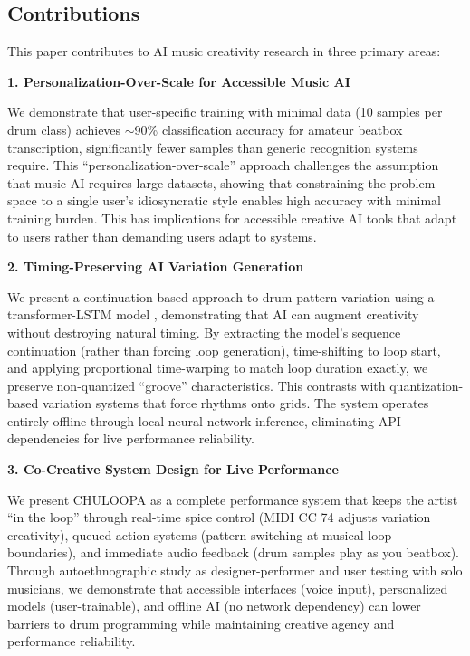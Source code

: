\documentclass{aimc2026}
\begin{document}
\subsection{Contributions}

This paper contributes to AI music creativity research in three primary areas:

\textbf{1. Personalization-Over-Scale for Accessible Music AI}

We demonstrate that user-specific training with minimal data (10 samples per drum class) achieves $\sim$90\% classification accuracy for amateur beatbox transcription, significantly fewer samples than generic recognition systems require. This ``personalization-over-scale'' approach challenges the assumption that music AI requires large datasets, showing that constraining the problem space to a single user's idiosyncratic style enables high accuracy with minimal training burden. This has implications for accessible creative AI tools that adapt to users rather than demanding users adapt to systems.

\textbf{2. Timing-Preserving AI Variation Generation}

We present a continuation-based approach to drum pattern variation using a transformer-LSTM model \citep{chen2025music}, demonstrating that AI can augment creativity without destroying natural timing. By extracting the model's sequence continuation (rather than forcing loop generation), time-shifting to loop start, and applying proportional time-warping to match loop duration exactly, we preserve non-quantized ``groove'' characteristics. This contrasts with quantization-based variation systems that force rhythms onto grids. The system operates entirely offline through local neural network inference, eliminating API dependencies for live performance reliability.

\textbf{3. Co-Creative System Design for Live Performance}

We present CHULOOPA as a complete performance system that keeps the artist ``in the loop'' through real-time spice control (MIDI CC 74 adjusts variation creativity), queued action systems (pattern switching at musical loop boundaries), and immediate audio feedback (drum samples play as you beatbox). Through autoethnographic study as designer-performer and user testing with solo musicians, we demonstrate that accessible interfaces (voice input), personalized models (user-trainable), and offline AI (no network dependency) can lower barriers to drum programming while maintaining creative agency and performance reliability.
\end{document}
